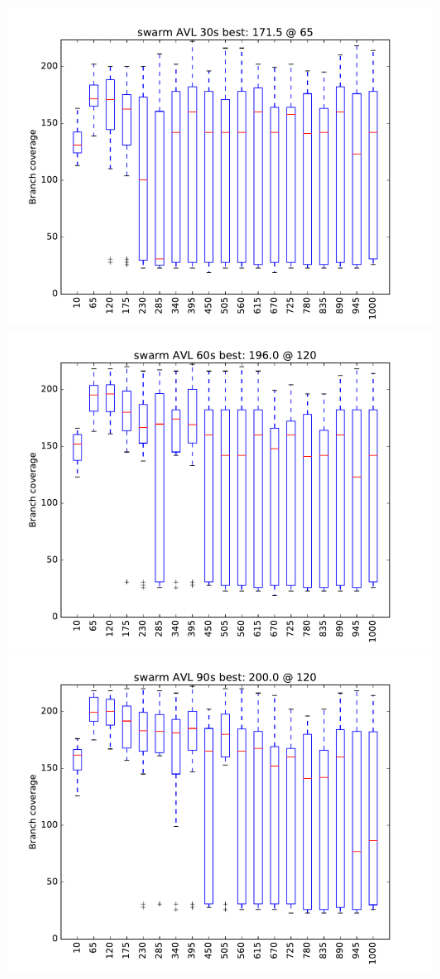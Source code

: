 \begin{figure}
\includegraphics[width=\columnwidth]{graphs/AVLswarm30}
\includegraphics[width=\columnwidth]{graphs/AVLswarm60}
\includegraphics[width=\columnwidth]{graphs/AVLswarm90}
\end{figure}

